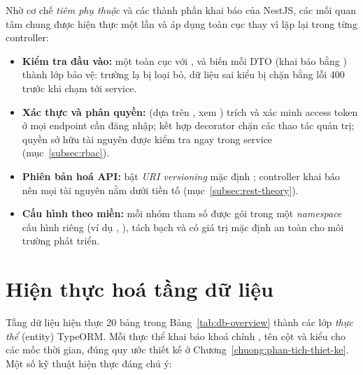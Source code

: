 Nhờ cơ chế \textit{tiêm phụ thuộc} và các thành phần khai báo của NestJS, các
mối quan tâm chung được hiện thực một lần và áp dụng toàn cục thay vì lặp lại
trong từng controller:

\begin{itemize}
  \item \textbf{Kiểm tra đầu vào:} một  toàn cục với
        ,  và 
        biến mỗi DTO (khai báo bằng ) thành lớp bảo vệ:
        trường lạ bị loại bỏ, dữ liệu sai kiểu bị chặn bằng lỗi 400 trước khi
        chạm tới service.
  \item \textbf{Xác thực và phân quyền:}  (dựa trên
        , xem ) trích và xác minh
        access token ở mọi endpoint cần đăng nhập;  kết hợp
        decorator  chặn các thao tác quản trị; quyền sở
        hữu tài nguyên được kiểm tra ngay trong service (mục~\ref{subsec:rbac}).
  \item \textbf{Phiên bản hoá API:} bật \textit{URI versioning} mặc định
        ; controller khai báo 
        nên mọi tài nguyên nằm dưới tiền tố  (mục~\ref{subsec:rest-theory}).
  \item \textbf{Cấu hình theo miền:} mỗi nhóm tham số được gói trong một
        \textit{namespace} cấu hình riêng (ví dụ ,
        ), tách bạch và có giá trị mặc định an toàn cho
        môi trường phát triển.
\end{itemize}

\section{Hiện thực hoá tầng dữ liệu}
\label{sec:hien-thuc-du-lieu}

Tầng dữ liệu hiện thực 20 bảng trong Bảng~\ref{tab:db-overview} thành các lớp
\textit{thực thể} (entity) TypeORM. Mỗi thực thể khai báo khoá chính
, tên cột  và kiểu  cho các mốc
thời gian, đúng quy ước thiết kế ở Chương~\ref{chuong:phan-tich-thiet-ke}.
Một số kỹ thuật hiện thực đáng chú ý:

